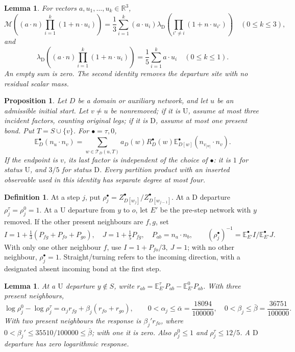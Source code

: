 \documentclass[11pt,reqno]{amsart}
\newtheorem{lemma}[theorem]{Lemma}
\newtheorem{proposition}[theorem]{Proposition}
\theoremstyle{definition}
\newtheorem{definition}[theorem]{Definition}
\theoremstyle{remark}
\begin{document}
\begin{lemma}\label{l:stepid}
For vectors \(a,u_1,\ldots,u_k\in\mathbb R^3\),
\[
 \mathcal M\!\left((a\cdot n)\prod_{i=1}^k(1+n\cdot u_i)\right)
 =\frac13\sum_{i=1}^k(a\cdot u_i)
       \lambda_{\mathrm D}\!\left(\prod_{i'\ne i}(1+n\cdot u_{i'})\right)
       \quad(0\le k\le3),
\]
and
\[
 \lambda_{\mathrm D}\!\left((a\cdot n)\prod_{i=1}^k(1+n\cdot u_i)\right)
       =\frac15\sum_{i=1}^k a\cdot u_i\quad(0\le k\le1).
\]
An empty sum is zero. The second identity removes the departure site
with no residual scalar mass.
\end{lemma}

\begin{proposition}\label{p:pairwalk}
Let \(D\) be a domain or auxiliary network, and let \(u\) be an
admissible initial start. Let \(v\ne u\) be nonremoved; if it is
\(\mathrm U\), assume at most three incident factors, counting
original legs; if it is \(\mathrm D\), assume at most one present bond.
Put \(T=S\cup\{v\}\). For \(\bullet=\tau,0\),
\[
 \mathbb E_D^\bullet(n_u\cdot n_v)=
 \sum_{w\in\mathcal T_D(u,T)}a_D(w)R_D^\bullet(w)
           \mathbb E_{D[w]}^\bullet(n_{v_{|w|}}\cdot n_v).
\]
If the endpoint is \(v\), its last factor is independent of the
choice of \(\bullet\): it is \(1\) for status \(\mathrm U\),
and \(3/5\) for status \(\mathrm D\).
Every partition product with an inserted observable used in this
identity has separate degree at most four.
\end{proposition}

\begin{definition}\label{d:ratios}
At a step \(j\), put
\(\rho_j^\bullet=Z^\bullet_{D[w_j]}/Z^\bullet_{D[w_{j-1}]}\).
At a \(\mathrm D\) departure \(\rho_j^\tau=\rho_j^0=1\).
At a \(\mathrm U\) departure from \(y\) to \(o\), let \(E'\)
be the pre-step network with \(y\) removed.
If the other present neighbours are \(f,g\), set
\[
 I=1+\tfrac13(P_{fg}+P_{fo}+P_{go}),\quad
 J=1+\tfrac15P_{fg},\quad P_{ab}=n_a\cdot n_b,\qquad
 (\rho_j^\bullet)^{-1}=\mathbb E_{E'}^\bullet I/
                                      \mathbb E_{E'}^\bullet J.
\]
With only one other neighbour \(f\), use \(I=1+P_{fo}/3,\ J=1\);
with no other neighbour, \(\rho_j^\bullet=1\).
Straight/turning refers to the incoming direction, with a designated
absent incoming bond at the first step.
\end{definition}

\begin{lemma}\label{l:response}
At a \(\mathrm U\) departure \(y\notin S\), write
\(r_{ab}=\mathbb E^\tau_{E'}P_{ab}-\mathbb E^0_{E'}P_{ab}\).
With three present neighbours,
\[
 \log\rho_j^0-\log\rho_j^\tau
       =\alpha_jr_{fg}+\beta_j(r_{fo}+r_{go}),\qquad
 0<\alpha_j\le\bar\alpha=\frac{18094}{100000},\quad
 0<\beta_j\le\bar\beta=\frac{36751}{100000}.
\]
With two present neighbours the response is \(\beta_j'r_{fo}\),
where \(0<\beta_j'\le35510/100000\le\bar\beta\);
with one it is zero. Also \(\rho_j^0\le1\) and
\(\rho_j^\tau\le12/5\).
A \(\mathrm D\) departure has zero logarithmic response.
\end{lemma}
\end{document}
